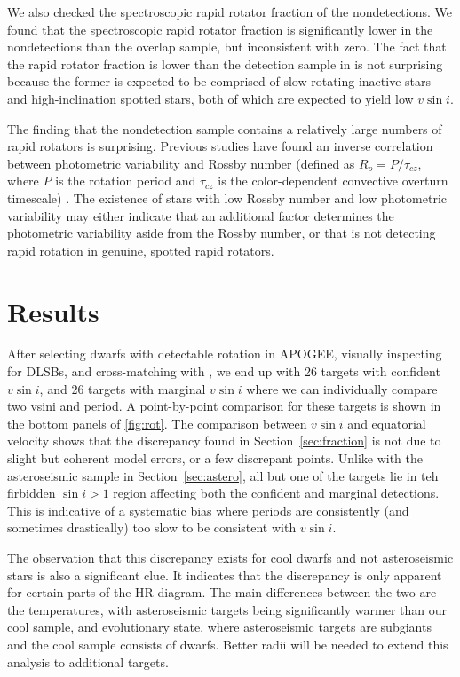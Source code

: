 \documentclass[manuscript]{aastex6}
\newcommand{\vsini}{\ensuremath{v \sin i}}
\begin{document}
We also checked the spectroscopic rapid rotator fraction of the 
\citet{McQuillan14} nondetections. We found that the spectroscopic rapid 
rotator fraction is significantly
lower in the nondetections than the overlap sample, but inconsistent with zero. 
The fact that the rapid rotator fraction is lower than the detection sample in
\citet{McQuillan14} is not surprising because the former is expected to be 
comprised of slow-rotating inactive stars and high-inclination spotted stars, 
both of which are expected to yield low \vsini{}. 

The finding that 
the nondetection sample contains a relatively large numbers of rapid rotators 
is surprising. Previous studies have found an inverse correlation between 
photometric variability and Rossby number (defined as \(R_o = P / \tau_{cz}\), where \(P\)
    is the rotation period and \(\tau_{cz}\) is the color-dependent 
convective overturn timescale) \citep{Messina01,Hartman09}. The existence of 
stars with low Rossby number and low photometric variability may either 
indicate that an additional factor determines the photometric variability 
aside from the Rossby number, or that \citet{McQuillan14} is not detecting 
rapid rotation in genuine, spotted rapid rotators.



\section{Results}
\label{sec:results}

After selecting dwarfs with detectable rotation in APOGEE,
visually inspecting for DLSBs, and cross-matching with \citet{McQuillan14}, we 
end up with 26 targets with confident \vsini{}, and 26 targets with marginal
\vsini{} where we can individually compare two vsini and period. 
A point-by-point
comparison for these targets is shown in the bottom panels of
\cref{fig:rot}. The comparison between \vsini{} and equatorial velocity shows
that the discrepancy found in Section~\ref{sec:fraction} is not due to slight
but coherent model errors, or a few discrepant points. Unlike with the
asteroseismic sample in Section~\ref{sec:astero}, all but one of the targets
lie in teh firbidden \(\sin i > 1\) region affecting both the confident and
marginal detections. This is indicative of a systematic
bias where periods are consistently (and sometimes drastically) too slow to be
consistent with \vsini{}.

The observation that this discrepancy exists for cool dwarfs and not
asteroseismic stars is also a significant clue. It indicates that the
discrepancy is only apparent for certain parts of the HR diagram. The main
differences between the two are the temperatures, with asteroseismic targets
being significantly warmer than our cool sample, and evolutionary state, where
asteroseismic targets are subgiants and the cool sample consists of dwarfs.
Better radii will be needed to extend this analysis to additional targets.
\end{document}
